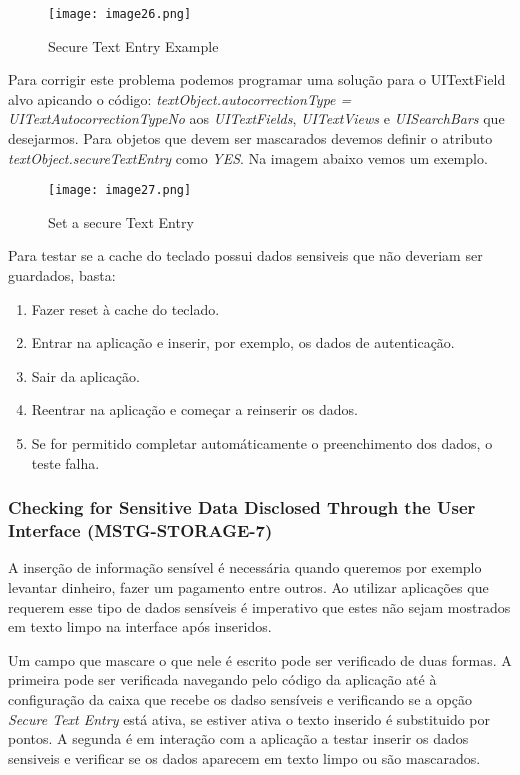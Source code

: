 \begin{figure}[H]
\centering
\texttt{[image: image26.png]}
\caption {Secure Text Entry Example}
\label {fig02}
\end{figure}



Para corrigir este problema podemos programar uma solução para o UITextField alvo apicando o código: \textit{textObject.autocorrectionType = UITextAutocorrectionTypeNo} aos \textit{UITextFields}, \textit{UITextViews} e \textit{UISearchBars} que desejarmos. Para objetos que devem ser mascarados devemos definir o atributo \textit{textObject.secureTextEntry} como \textit{YES}.  Na imagem abaixo vemos um exemplo.
	 
\begin{figure}[H]
\centering
\texttt{[image: image27.png]}
\caption {Set a secure Text Entry}
\label {fig02}
\end{figure}

Para testar se a cache do teclado possui dados sensiveis que não deveriam ser guardados, basta:
\begin{enumerate}
	\item Fazer reset à cache do teclado.
	\item Entrar na aplicação e inserir, por exemplo, os dados de autenticação.
	\item Sair da aplicação.
	\item Reentrar na aplicação e começar a reinserir os dados. 
	\item Se for permitido completar automáticamente o preenchimento dos dados, o teste falha.
\end{enumerate}



\subsubsection{Checking for Sensitive Data Disclosed Through the User Interface (MSTG-STORAGE-7)}
\hfill\par
\hfill\par


A inserção de informação sensível é necessária quando queremos por exemplo levantar dinheiro, fazer um pagamento entre outros. Ao utilizar aplicações que requerem esse tipo de dados sensíveis é imperativo que estes não sejam mostrados em texto limpo na interface após inseridos.\par
\hfill\par
Um campo que mascare o que nele é escrito pode ser verificado de duas formas.
A primeira pode ser verificada navegando pelo código da aplicação até à configuração da caixa que recebe os dadso sensíveis e verificando se a opção \textit{Secure Text Entry} está ativa, se estiver ativa o texto inserido é substituido por pontos.
A segunda é em interação com a aplicação a testar inserir os dados sensiveis e verificar se os dados aparecem em texto limpo ou são mascarados.




